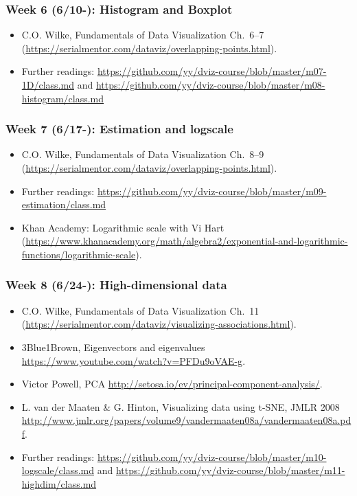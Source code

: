 \subsubsection{Week 6 (6/10-): Histogram and Boxplot }%

\begin{itemize}\itemsep0em 
\item C.O. Wilke, Fundamentals of Data Visualization Ch.~6--7 (\url{https://serialmentor.com/dataviz/overlapping-points.html}). 
\item Further readings: \url{https://github.com/yy/dviz-course/blob/master/m07-1D/class.md} and \url{https://github.com/yy/dviz-course/blob/master/m08-histogram/class.md}
\end{itemize}	
\subsubsection{Week 7 (6/17-): Estimation and logscale }%

\begin{itemize}\itemsep0em 
\item C.O. Wilke, Fundamentals of Data Visualization Ch.~8--9 (\url{https://serialmentor.com/dataviz/overlapping-points.html}). 
\item Further readings: \url{https://github.com/yy/dviz-course/blob/master/m09-estimation/class.md}
\item Khan Academy: Logarithmic scale with Vi Hart (\url{https://www.khanacademy.org/math/algebra2/exponential-and-logarithmic-functions/logarithmic-scale}). 
\end{itemize}	
\subsubsection{Week 8 (6/24-): High-dimensional data }%

\begin{itemize}\itemsep0em 
\item C.O. Wilke, Fundamentals of Data Visualization Ch.~11 (\url{https://serialmentor.com/dataviz/visualizing-associations.html}). 
\item 3Blue1Brown, Eigenvectors and eigenvalues \url{https://www.youtube.com/watch?v=PFDu9oVAE-g}. 
\item Victor Powell, PCA \url{http://setosa.io/ev/principal-component-analysis/}.
\item L. van der Maaten \& G. Hinton, Visualizing data using t-SNE, JMLR 2008 \url{http://www.jmlr.org/papers/volume9/vandermaaten08a/vandermaaten08a.pdf}.
\item Further readings: \url{https://github.com/yy/dviz-course/blob/master/m10-logscale/class.md} and \url{https://github.com/yy/dviz-course/blob/master/m11-highdim/class.md}
\end{itemize}	

